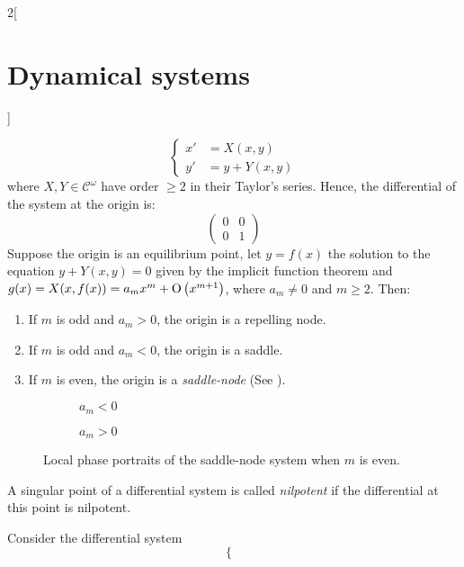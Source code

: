 \documentclass[../../../main_math.tex]{subfiles}
\begin{document}
\begin{multicols}{2}[\section{Dynamical systems}]
\begin{theorem}
$$      \left\{
      \begin{aligned}
        {x}' & = X(x,y)    \\
        {y}' & = y+ Y(x,y)
      \end{aligned}
      \right.
    $$
    where $X,Y\in\mathcal{C}^\omega$ have order $\geq 2$ in their Taylor's series. Hence, the differential of the system at the origin is:
    $$\begin{pmatrix}
        0 & 0 \\
        0 & 1
      \end{pmatrix}$$ Suppose the origin is an equilibrium point, let $y=f(x)$ the solution to the equation $y+Y(x,y)=0$ given by the implicit function theorem and $g(x)=X(x,f(x))=a_mx^m+\mathrm{O}\left(x^{m+1}\right)$, where $a_m\ne 0$ and $m\geq 2$. Then:
    \begin{enumerate}
      \item If $m$ is odd and $a_m>0$, the origin is a repelling node.
      \item If $m$ is odd and $a_m<0$, the origin is a saddle.
      \item If $m$ is even, the origin is a \emph{saddle-node} (See ).
    \end{enumerate}
    \begin{figure}[H]
      \centering
      \begin{subfigure}[b]{0.45\linewidth}
        \centering
        
        \caption{$a_m<0$}
      \end{subfigure}
      \hfill
      \begin{subfigure}[b]{0.45\linewidth}
        \centering
        
        \caption{$a_m>0$}
      \end{subfigure}
      \caption{Local phase portraits of the saddle-node system when $m$ is even.}
      \label{DS:meven}
    \end{figure}
  \end{theorem}
  \begin{definition}
    A singular point of a differential system is called \emph{nilpotent} if the differential at this point is nilpotent.
  \end{definition}
  \begin{theorem}\label{DS:thmB}
    Consider the differential system
    $$
      \left\{
      \begin{aligned}

\end{aligned}$$
\end{theorem}
\end{multicols}
\end{document}
